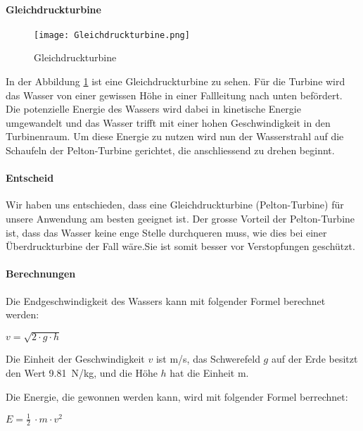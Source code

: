 \paragraph{Gleichdruckturbine}

\begin{figure} [H]
	\centering
	\texttt{[image: Gleichdruckturbine.png]}
	\caption{Gleichdruckturbine \cite{wiki_gleichdruckturbine}}
	\label{fig:Gleichdruckturbine}
\end{figure}

In der Abbildung \ref{fig:Gleichdruckturbine}  ist eine Gleichdruckturbine zu sehen. Für die Turbine wird das Wasser von einer gewissen Höhe in einer Fallleitung nach unten befördert. Die potenzielle Energie des Wassers wird dabei in kinetische Energie umgewandelt und das Wasser trifft mit einer hohen Geschwindigkeit in den Turbinenraum. Um diese Energie zu nutzen wird nun der Wasserstrahl auf die Schaufeln der Pelton-Turbine gerichtet, die anschliessend zu drehen beginnt. 

\paragraph{Entscheid}

Wir haben uns entschieden, dass eine Gleichdruckturbine (Pelton-Turbine) für unsere Anwendung am besten geeignet ist. Der grosse Vorteil der Pelton-Turbine ist, dass das Wasser keine enge Stelle durchqueren muss, wie dies bei einer Überdruckturbine der Fall wäre.Sie ist somit besser  vor Verstopfungen geschützt.

\newpage

\paragraph{Berechnungen}

Die Endgeschwindigkeit des Wassers kann mit folgender Formel berechnet werden:
\begin{center}
\(v = \sqrt{2 \cdot g \cdot h} \)
\end{center}

Die Einheit der Geschwindigkeit \(v\) ist \si{m/s}, das Schwerefeld \(g\) auf der Erde besitzt den Wert 9.81~\si{N/kg}, und die Höhe \(h\) hat die Einheit \si{m}.

\bigskip

Die Energie, die gewonnen werden kann, wird mit folgender Formel berrechnet:

\begin{center}
\(E =\frac 12\ \cdot m \cdot v^2\)
\end{center}

